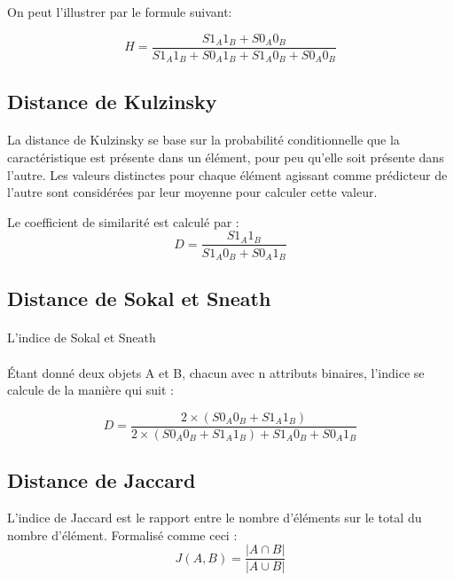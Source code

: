 \documentclass[11pt]{article}
\begin{document}
On peut l’illustrer par le formule suivant:

\begin{equation}
   H = \frac{S1_{A}1_{B}+S0_{A}0_{B}}{S1_{A}1_{B} + S0_{A}1_{B}+S1_{A}0_{B} + S0_{A}0_{B}}
\end{equation}


\subsection{Distance de Kulzinsky}
\paragraph{}
La distance de Kulzinsky se base sur la probabilité conditionnelle que la caractéristique est présente dans un élément, pour peu qu'elle soit présente dans l'autre. Les valeurs distinctes pour chaque élément agissant comme prédicteur de l'autre sont considérées par leur moyenne pour calculer cette valeur.

Le coefficient de similarité est calculé par :
\begin{equation}
   D = \frac{S1_{A}1_{B}}{S1_{A}0_{B} + S0_{A}1_{B}}
\end{equation}

\subsection{Distance de Sokal et Sneath}
\paragraph{}
L'indice de Sokal et Sneath 
\paragraph{}
\'{E}tant donné deux objets A et B, chacun avec n attributs binaires, l’indice se calcule de la manière qui suit :

\begin{equation}
   D = \frac{2\times(S0_{A}0_{B}+S1_{A}1_{B})}{2\times(S0_{A}0_{B} + S1_{A}1_{B})+S1_{A}0_{B} + S0_{A}1_{B}}
\end{equation}

\subsection{Distance de Jaccard}

L'indice de Jaccard est le rapport entre le nombre d'éléments sur le total du nombre d'élément. Formalisé comme ceci :
\begin{equation}
   J( A, B)= \frac{|A \cap B|}{|A \cup B|}
\end{equation}
\end{document}
